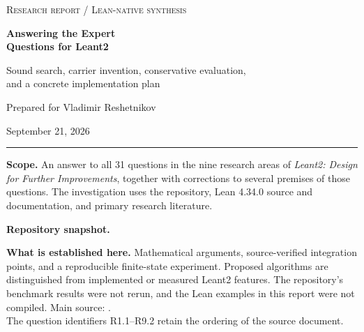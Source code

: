 \documentclass[11pt,a4paper]{article}
\theoremstyle{remark}
\begin{document}
\begin{titlepage}
\vspace*{16mm}
{\color{teal!60!black}\large\textsc{Research report \quad / \quad Lean-native synthesis}}\par
\vspace{12mm}
{\Huge\bfseries Answering the Expert\\[4pt] Questions for Leant2\par}
\vspace{8mm}
{\Large Sound search, carrier invention, conservative evaluation,\\[3pt]
and a concrete implementation plan\par}
\vspace{14mm}
{\large Prepared for Vladimir Reshetnikov\par}
{\large September 21, 2026\par}
\vspace{12mm}
\hrule
\vspace{5mm}
\textbf{Scope.} An answer to all 31 questions in the nine research areas of
\emph{Leant2: Design for Further Improvements}, together with corrections to
several premises of those questions. The investigation uses the repository,
Lean 4.34.0 source and documentation, and primary research literature.
\vspace{5mm}

\textbf{Repository snapshot.}\par
{}\par
{}
\vspace{5mm}

\textbf{What is established here.} Mathematical arguments, source-verified
integration points, and a reproducible finite-state experiment. Proposed
algorithms are distinguished from implemented or measured Leant2 features.
The repository's benchmark results were not rerun, and the Lean examples in
this report were not compiled.
\vfill
{\small Main source: .\\
The question identifiers R1.1--R9.2 retain the ordering of the source document.}
\end{titlepage}
\end{document}
